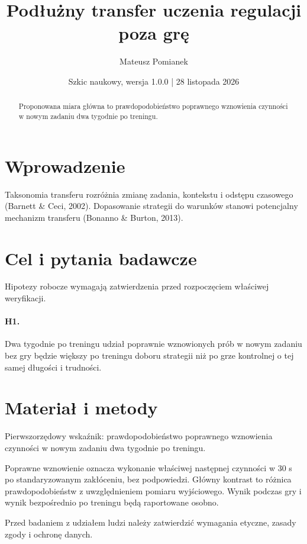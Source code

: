 \documentclass[11pt,a4paper]{article}
\title{Podłużny transfer uczenia regulacji poza grę}
\author{Mateusz Pomianek}
\date{Szkic naukowy, wersja 1.0.0 | 28 listopada 2026}
\begin{document}
\maketitle

\begin{abstract}

Proponowana miara główna to prawdopodobieństwo poprawnego wznowienia czynności w nowym zadaniu dwa tygodnie po treningu.

\end{abstract}

\section{Wprowadzenie}

Taksonomia transferu rozróżnia zmianę zadania, kontekstu i odstępu czasowego (Barnett \& Ceci, 2002). Dopasowanie strategii do warunków stanowi potencjalny mechanizm transferu (Bonanno \& Burton, 2013).

\section{Cel i pytania badawcze}

Hipotezy robocze wymagają zatwierdzenia przed rozpoczęciem właściwej weryfikacji.

\paragraph{H1.} Dwa tygodnie po treningu udział poprawnie wznowionych prób w nowym zadaniu bez gry będzie większy po treningu doboru strategii niż po grze kontrolnej o tej samej długości i trudności.

\section{Materiał i metody}

Pierwszorzędowy wskaźnik: prawdopodobieństwo poprawnego wznowienia czynności w nowym zadaniu dwa tygodnie po treningu.

Poprawne wznowienie oznacza wykonanie właściwej następnej czynności w 30 s po standaryzowanym zakłóceniu, bez podpowiedzi. Główny kontrast to różnica prawdopodobieństw z uwzględnieniem pomiaru wyjściowego. Wynik podczas gry i wynik bezpośrednio po treningu będą raportowane osobno.

Przed badaniem z udziałem ludzi należy zatwierdzić wymagania etyczne, zasady zgody i ochronę danych.
\end{document}
